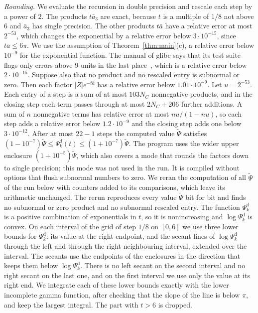 \documentclass[11pt]{amsart}
\theoremstyle{definition}
\theoremstyle{remark}
\numberwithin{equation}{section}
\newcommand{\KmaxW}{22}
\newcommand{\Kmax}{\KmaxW}
\begin{document}
\emph{Rounding.} We evaluate the recursion in double precision and rescale each step by a power of $2$. The products $t\bar a_3$ are exact, because $t$ is a multiple of $1/8$ not above $6$ and $\bar a_3$ has single precision. The other products $t\bar a$ have a relative error at most $2^{-53}$, which changes the exponential by a relative error below $3\cdot10^{-15}$, since $t\bar a\le6\pi$. We use the assumption of Theorem~\ref{thm:main}(c), a relative error below $10^{-9}$ for the exponential function. The manual of glibc says that its test suite flags only errors above $9$ units in the last place~\cite[Section~19.7]{glibc}, which is a relative error below $2\cdot10^{-15}$. Suppose also that no product and no rescaled entry is subnormal or zero. Then each factor $|Z|e^{-t\bar a}$ has a relative error below $1.01\cdot10^{-9}$. Let $u=2^{-53}$. Each entry of a step is a sum of at most $103N_C$ nonnegative products, and in the closing step each term passes through at most $2N_C+206$ further additions. A sum of $n$ nonnegative terms has relative error at most $nu/(1-nu)$, so each step adds a relative error below $1.2\cdot10^{-9}$ and the closing step adds one below $3\cdot10^{-12}$. After at most $\Kmax-1$ steps the computed value $\tilde\Psi$ satisfies $(1-10^{-7})\tilde\Psi\le\Psi_k^{\mathrm d}(t)\le(1+10^{-7})\tilde\Psi$. The program uses the wider upper enclosure $(1+10^{-5})\tilde\Psi$, which also covers a mode that rounds the factors down to single precision; this mode was not used in the run. It is compiled without options that flush subnormal numbers to zero. We reran the computation of all $\tilde\Psi$ of the run below with counters added to its comparisons, which leave its arithmetic unchanged. The rerun reproduces every value $\tilde\Psi$ bit for bit and finds no subnormal or zero product and no subnormal rescaled entry. The function $\Psi_k^{\mathrm d}$ is a positive combination of exponentials in $t$, so it is nonincreasing and $\log\Psi_k^{\mathrm d}$ is convex. On each interval of the grid of step $1/8$ on $[0,6]$ we use three lower bounds for $\Psi_k^{\mathrm d}$: its value at the right endpoint, and the secant lines of $\log\Psi_k^{\mathrm d}$ through the left and through the right neighbouring interval, extended over the interval. The secants use the endpoints of the enclosures in the direction that keeps them below $\log\Psi_k^{\mathrm d}$. There is no left secant on the second interval and no right secant on the last one, and on the first interval we use only the value at its right end. We integrate each of these lower bounds exactly with the lower incomplete gamma function, after checking that the slope of the line is below $\pi$, and keep the largest integral. The part with $t>6$ is dropped.
\end{document}
